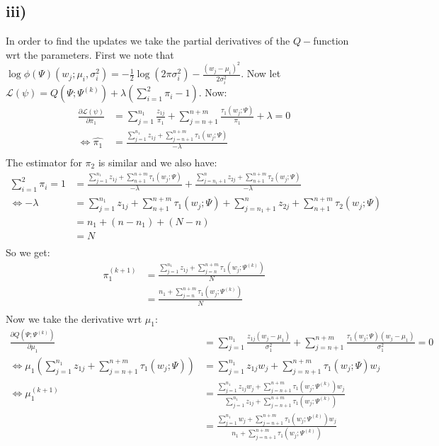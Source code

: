 \documentclass{article}
\begin{document}
\subsection*{iii)}
In order to find the updates we take the partial derivatives of the $Q-$function wrt the parameters. First we note that $\log\phi(\Psi)(w_j;\mu_i,\sigma_i^2)=-\frac{1}{2}\log(2\pi\sigma_i^2)-\frac{(w_j-\mu_i)^2}{2\sigma_i^2}$. Now let $\mathcal{L}(\psi)=Q(\Psi;\Psi^{(k)})+\lambda(\sum_{i=1}^{2}\pi_i-1)$. Now:
\begin{align*}
\frac{\partial\mathcal{L}(\psi)}{\partial\pi_1}&=\sum_{j=1}^{n_1}\frac{z_{1j}}{\pi_1}+\sum_{j=n+1}^{n+m}\frac{\tau_{1}(w_j;\Psi)}{\pi_1}+\lambda=0\\
\iff\hat{\pi_1}&=\frac{\sum_{j=1}^{n_1}z_{1j}+\sum_{j=n+1}^{n+m}\tau_{1}(w_j;\Psi)}{-\lambda}\\
\end{align*}
The estimator for $\pi_2$ is similar and we also have:
\begin{align*}
\sum_{i=1}^{2}\pi_i=1&=\frac{\sum_{j=1}^{n_1}z_{1j}+\sum_{n+1}^{n+m}\tau_{1}(w_j;\Psi)}{-\lambda}+\frac{\sum_{j=n_1+1}^{n}z_{2j}+\sum_{n+1}^{n+m}\tau_{2}(w_j;\Psi)}{-\lambda}\\
\iff-\lambda&=\sum_{j=1}^{n_1}z_{1j}+\sum_{n+1}^{n+m}\tau_{1}(w_j;\Psi)+\sum_{j=n_1+1}^{n}z_{2j}+\sum_{n+1}^{n+m}\tau_{2}(w_j;\Psi)\\
&=n_1+(n-n_1)+(N-n)\\
&=N\\
\end{align*}
So we get:
\begin{align*}
\pi_1^{(k+1)}&=\frac{\sum_{j=1}^{n_1}z_{1j}+\sum_{j=n}^{n+m}\tau_{1}(w_j;\Psi^{(k)})}{N}\\
&=\frac{n_1+\sum_{j=n}^{n+m}\tau_{1}(w_j;\Psi^{(k)})}{N}\\
\end{align*}
Now we take the derivative wrt $\mu_1$:
\begin{align*}
\frac{\partial Q(\Psi;\Psi^{(k)})}{\partial\mu_1}&=\sum_{j=1}^{n_1}\frac{z_{1j}(w_j-\mu_1)}{\sigma_1^2}+\sum_{j=n+1}^{n+m}\frac{\tau_{1}(w_j;\Psi)(w_j-\mu_1)}{\sigma_1^2}=0\\
\iff\mu_1\left(\sum_{j=1}^{n_1}z_{1j}+\sum_{j=n+1}^{n+m}\tau_{1}(w_j;\Psi)\right)&=\sum_{j=1}^{n_1}z_{1j}w_j+\sum_{j=n+1}^{n+m}\tau_{1}(w_j;\Psi)w_j\\
\iff\mu_1^{(k+1)}&=\frac{\sum_{j=1}^{n_1}z_{1j}w_j+\sum_{j=n+1}^{n+m}\tau_{1}(w_j;\Psi^{(k)})w_j}{\sum_{j=1}^{n_1}z_{1j}+\sum_{j=n+1}^{n+m}\tau_{1}(w_j;\Psi^{(k)})}\\
&=\frac{\sum_{j=1}^{n_1}w_j+\sum_{j=n+1}^{n+m}\tau_{1}(w_j;\Psi^{(k)})w_j}{n_1+\sum_{j=n+1}^{n+m}\tau_{1}(w_j;\Psi^{(k)})}\\
\end{align*}
\end{document}
